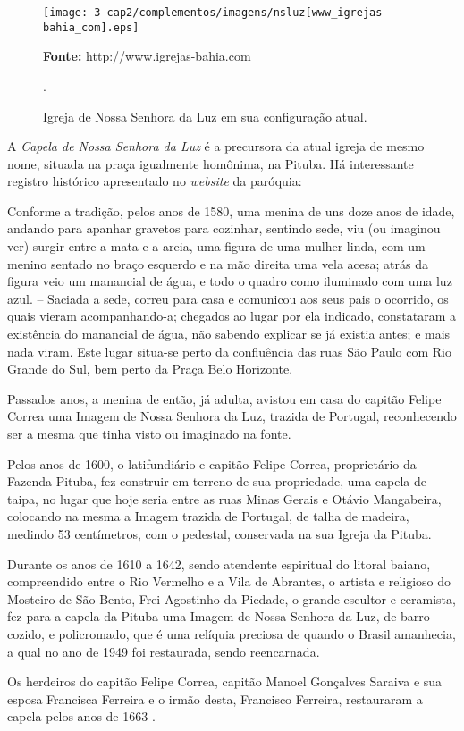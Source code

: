 \begin{figure}[!htp]
\centering
\texttt{[image: 3-cap2/complementos/imagens/nsluz[www\_igrejas-bahia\_com].eps]}{\footnotesize \par \textbf{Fonte:} http://www.igrejas-bahia.com \par}
\caption{Igreja de Nossa Senhora da Luz em sua configuração atual.}.
\end{figure}

A \textit{Capela de Nossa Senhora da Luz} é a precursora da atual igreja de mesmo nome, situada na praça igualmente homônima, na Pituba. Há interessante registro histórico apresentado no \textit{website} da paróquia:

\begin{citacao}
Conforme a tradição, pelos anos de 1580, uma menina de uns doze anos de idade, andando para apanhar gravetos para cozinhar, sentindo sede, viu (ou imaginou ver) surgir entre a mata e a areia, uma figura de uma mulher linda, com um menino sentado no braço esquerdo e na mão direita uma vela acesa; atrás da figura veio um manancial de água, e todo o quadro como iluminado com uma luz azul. – Saciada a sede, correu para casa e comunicou aos seus pais o ocorrido, os quais vieram acompanhando-a; chegados ao lugar por ela indicado, constataram a existência do manancial de água, não sabendo explicar se já existia antes; e mais nada viram. Este lugar situa-se perto da confluência das ruas São Paulo com Rio Grande do Sul, bem perto da Praça Belo Horizonte.

Passados anos, a menina de então, já adulta, avistou em casa do capitão Felipe Correa uma Imagem de Nossa Senhora da Luz, trazida de Portugal, reconhecendo ser a mesma que tinha visto ou imaginado na fonte.

Pelos anos de 1600, o latifundiário e capitão Felipe Correa, proprietário da Fazenda Pituba, fez construir em terreno de sua propriedade, uma capela de taipa, no lugar que hoje seria entre as ruas Minas Gerais e Otávio Mangabeira, colocando na mesma a Imagem trazida de Portugal, de talha de madeira, medindo 53 centímetros, com o pedestal, conservada na sua Igreja da Pituba.

Durante os anos de 1610 a 1642, sendo atendente espiritual do litoral baiano, compreendido entre o Rio Vermelho e a Vila de Abrantes, o artista e religioso do Mosteiro de São Bento, Frei Agostinho da Piedade, o grande escultor e ceramista, fez para a capela da Pituba uma Imagem de Nossa Senhora da Luz, de barro cozido, e policromado, que é uma relíquia preciosa de quando o Brasil amanhecia, a qual no ano de 1949 foi restaurada, sendo reencarnada.

Os herdeiros do capitão Felipe Correa, capitão Manoel Gonçalves Saraiva e sua esposa Francisca Ferreira e o irmão desta, Francisco Ferreira, restauraram a capela pelos anos de 1663 \cite{fernandez_historia_1969}.
\end{citacao}

